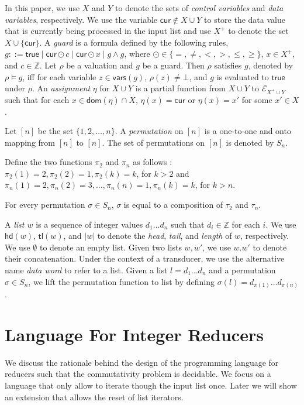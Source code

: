 \documentclass[runningheads,a4paper]{llncs}
\def\Ee{{\mathcal{E} }}
\newcommand\intnum{{\mathbb{Z} }}
\newcommand\cur{\mathsf{cur}}
\newcommand\head{\mathsf{hd}}
\newcommand\tail{\mathsf{tl}}
\newcommand\vars{\mathsf{vars}}
\newcommand\dom{\mathsf{dom}}
\newcommand\ltrue{\mathsf{true}}
\newcommand{\interval}[1]{[#1]}
\begin{document}
In this paper, we use $X$ and $Y$ to denote the sets of \emph{control variables} and \emph{data variables}, respectively. We use the variable $\cur \notin X\cup Y$ to store the data value that is currently being processed in the input list and use $X^+$ to denote the set $X\cup \{\cur\}$.
A \emph{guard} is a formula defined by the following rules, $g::= \ltrue \mid \cur\odot c \mid \cur\odot x \mid g \wedge g$, where $\odot \in \{=,\neq,<, >, \le, \ge\}$, $x \in X^+$, and $c\in \intnum$. 
Let $\rho$ be a valuation and $g$ be a guard. Then $\rho$ satisfies $g$, denoted by $\rho \models g$, iff for each variable $z \in \vars(g)$, $\rho(z) \neq \bot$, and $g$ is evaluated to $\ltrue$ under $\rho$. An \emph{assignment} $\eta$ for $X \cup Y$ is a partial function from $X \cup Y$ to $\Ee_{X^+ \cup Y}$ such that for each $x \in \dom(\eta) \cap X$, $\eta(x)=\cur$ or $\eta(x) = x'$ for some $x' \in X$.

Let $\interval{n}$ be the set $\{ 1, 2, \ldots, n \}$. A \emph{permutation} on
$\interval{n}$ is a one-to-one and onto mapping from $\interval{n}$ to
$\interval{n}$. The set of
permutations on $\interval{n}$ is denoted by $S_n$.

Define the two functions $\pi_2$ and $\pi_n$ as follows : $\pi_2(1)=2,\pi_2(2)=1,\pi_2(k)=k$, for $k>2$ and
$\pi_n(1)=2,\pi_n(2)=3,\ldots,\pi_n(n)=1, \pi_n(k)=k$, for $k>n$.

\begin{theorem}
	For every permutation $\sigma \in S_n$, $\sigma$ is equal to a
	composition of $\tau_2$ and $\tau_n$.
	\label{theorem:symmetric-basis}
\end{theorem}

A \emph{list $w$} is a sequence of integer values $d_1\ldots d_n$ such that $d_i \in \intnum$ for each $i$.
We use $\head(w)$, $\tail(w)$, and $|w|$ to denote the \emph{head}, \emph{tail}, and \emph{length} of $w$, respectively.
We use $\emptyset$ to denote an empty list.
Given two lists $w,w'$, we use $w.w'$ to denote their concatenation.
Under the context of a transducer, we use the alternative name \emph{data word} to refer to a list.
Given a list $l=d_1\ldots d_n$ and a permutation $\sigma \in S_n$, we lift the permutation function to list by defining $\sigma(l)=d_{\pi(1)} \ldots d_{\pi(n)}$.

 
\section{Language For Integer Reducers}\label{sec-mr-prog}
We discuss the rationale behind the design of the programming language for reducers such that the commutativity problem is decidable.
We focus on a language that only allow to iterate though the input list once. Later we will show an extension that allows the reset of list iterators.
\end{document}
